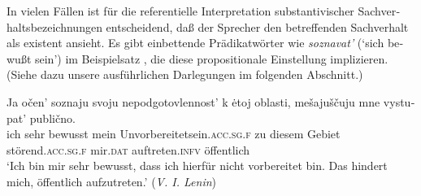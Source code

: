 \documentclass[output=paper]{langscibook}
\begin{document}
\begin{otherlanguage}{german}




\noindent In vielen Fällen ist für die referentielle Interpretation substantivischer Sachverhaltsbezeichnungen entscheidend, daß der Sprecher den betreffenden Sachverhalt als existent ansieht. Es gibt einbettende Prädikatwörter wie \textit{soznavat’} (‘sich bewußt sein’) im Beispielsatz , die diese propositionale Einstellung im\-pli\-zie\-ren. (Siehe dazu unsere ausführlichen Darlegungen im folgenden Abschnitt.)

\ea \label{ex:zi83:24}
    \gll Ja očen’ soznaju svoju nepodgotovlennost’ k ėtoj oblasti, mešajuščuju mne vystupat’ publično. \\
    ich sehr  bewusst mein Unvorbereitetsein.\textsc{acc}.\textsc{sg}.\textsc{f} zu diesem Gebiet  störend.\textsc{acc}.\textsc{sg}.\textsc{f} mir.\textsc{dat} auftreten.\textsc{infv} öffentlich \\
    \glt ‘Ich bin mir sehr bewusst, dass ich hierfür nicht vorbereitet bin. Das hindert mich, öffentlich aufzutreten.’ (\textit{V. I. Lenin})
\z



\end{otherlanguage}
\end{document}
